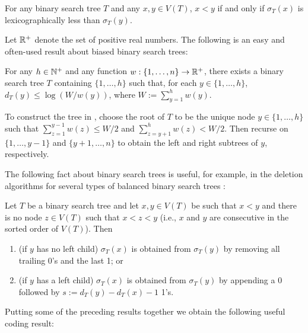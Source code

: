 \documentclass[kpfonts]{patmorin}
\begin{document}
\begin{obs}
  For any binary search tree $T$ and any $x,y\in V(T)$, $x<y$ if and only if $\sigma_T(x)$ is lexicographically less than $\sigma_T(y)$.
\end{obs}

Let $\mathbb{R}^+$ denote the set of positive real numbers. The following is an easy and often-used result about biased binary search trees:

\begin{lem}
  For any $h\in\mathbb{N}^+$ and any function $w:\{1,\ldots,n\}\to\mathbb{R}^+$, there exists a binary search tree $T$ containing $\{1,\ldots,h\}$ such that, for each $y\in\{1,\ldots,h\}$, $d_T(y)\le\log(W/w(y))$, where $W:=\sum_{y=1}^h w(y)$.
\end{lem}

To construct the tree in , choose the root of $T$ to be the unique node $y\in\{1,\ldots,h\}$ such that $\sum_{z=1}^{y-1} w(z)\le W/2$ and $\sum_{z=y+1}^{h} w(z)< W/2$.  Then recurse on $\{1,\ldots,y-1\}$ and $\{y+1,\ldots,n\}$ to obtain the left and right subtrees of $y$, respectively.

The following fact about binary search trees is useful, for example, in the deletion algorithms for several types of balanced binary search trees \cite[Section~6.2.3]{morin:open}:

\begin{lem}
  Let $T$ be a binary search tree and let $x,y\in V(T)$ be such that $x<y$ and there is no node $z\in V(T)$ such that $x<z<y$ (i.e., $x$ and $y$ are consecutive in the sorted order of $V(T)$).  Then
  \begin{enumerate}
    \item (if $y$ has no left child) $\sigma_T(x)$ is obtained from $\sigma_T(y)$ by removing all trailing 0's and the last 1; or
    \item (if $y$ has a left child) $\sigma_T(x)$ is obtained from $\sigma_T(y)$ by appending a 0 followed by $s:=d_T(y)-d_T(x)-1$ 1's.
  \end{enumerate}
\end{lem}

Putting some of the preceding results together we obtain the following useful coding result:
\end{document}
